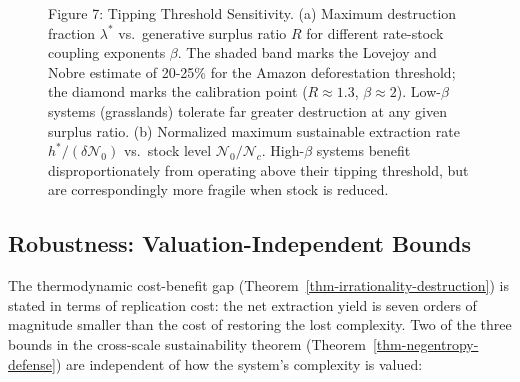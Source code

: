 \documentclass[11pt]{article}
\theoremstyle{plain}
\theoremstyle{definition}
\theoremstyle{remark}
\let\origsubsection\subsection
\renewcommand{\subsection}{\needspace{7\baselineskip}\origsubsection}
\newcommand{\pandocbounded}[1]{%
  \sbox0{#1}%
  \ifdim\wd0>\linewidth
    \resizebox{\linewidth}{!}{#1}%
  \else
    #1%
  \fi
}
\begin{document}
\begin{figure}
\centering
\pandocbounded{\includegraphics[keepaspectratio,alt={Figure 7: Tipping Threshold Sensitivity. (a) Maximum destruction fraction \textbackslash lambda\^{}* vs.~generative surplus ratio R for different rate-stock coupling exponents \textbackslash beta. The shaded band marks the Lovejoy and Nobre {[}-@LovejoyNobre2018{]} estimate of 20-25\% for the Amazon deforestation threshold; the diamond marks the calibration point (R \textbackslash approx 1.3, \textbackslash beta \textbackslash approx 2). Low-\textbackslash beta systems (grasslands) tolerate far greater destruction at any given surplus ratio. (b) Normalized maximum sustainable extraction rate h\^{}*/(\textbackslash delta\textbackslash mathcal\{N\}\_0) vs.~stock level \textbackslash mathcal\{N\}\_0/\textbackslash mathcal\{N\}\_c. High-\textbackslash beta systems benefit disproportionately from operating above their tipping threshold, but are correspondingly more fragile when stock is reduced.}]{fig_tipping_threshold.png}}
\caption{Figure 7: Tipping Threshold Sensitivity. (a) Maximum
destruction fraction \(\lambda^*\) vs.~generative surplus ratio \(R\)
for different rate-stock coupling exponents \(\beta\). The shaded band
marks the Lovejoy and Nobre \citeyearpar{LovejoyNobre2018} estimate of
20-25\% for the Amazon deforestation threshold; the diamond marks the
calibration point (\(R \approx 1.3\), \(\beta \approx 2\)).
Low-\(\beta\) systems (grasslands) tolerate far greater destruction at
any given surplus ratio. (b) Normalized maximum sustainable extraction
rate \(h^*/(\delta\mathcal{N}_0)\) vs.~stock level
\(\mathcal{N}_0/\mathcal{N}_c\). High-\(\beta\) systems benefit
disproportionately from operating above their tipping threshold, but are
correspondingly more fragile when stock is reduced.}
\end{figure}

\subsection{Robustness: Valuation-Independent
Bounds}\label{robustness-valuation-independent-bounds}

The thermodynamic cost-benefit gap
(Theorem~\ref{thm-irrationality-destruction}) is stated in terms of
replication cost: the net extraction yield is seven orders of magnitude
smaller than the cost of restoring the lost complexity. Two of the three
bounds in the cross-scale sustainability theorem
(Theorem~\ref{thm-negentropy-defense}) are independent of how the
system's complexity is valued:
\end{document}

